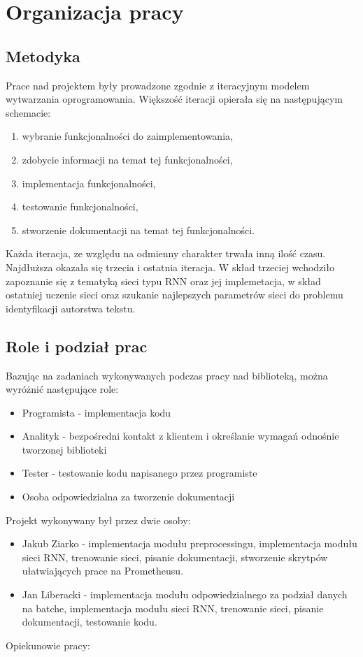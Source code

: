 \newpage
\section{Organizacja pracy}

\subsection{Metodyka}

Prace nad projektem były prowadzone zgodnie z iteracyjnym modelem wytwarzania oprogramowania. 
Większość iteracji opierała się na następującym schemacie: 
\begin{enumerate}
  \item wybranie funkcjonalności do zaimplementowania,
  \item zdobycie informacji na temat tej funkcjonalności,
  \item implementacja funkcjonalności,
  \item testowanie funkcjonalności,
  \item stworzenie dokumentacji na temat tej funkcjonalności.
\end{enumerate}
Każda iteracja, ze względu na odmienny charakter trwała inną ilość czasu. Najdłuższa okazała się
trzecia i ostatnia iteracja. W skład trzeciej wchodziło zapoznanie się z tematyką sieci typu RNN oraz
jej implemetacja, w skład ostatniej uczenie sieci oraz szukanie najlepszych parametrów sieci do problemu 
identyfikacji autorstwa tekstu.

\subsection{Role i podział prac}
Bazując na zadaniach wykonywanych podczas pracy nad biblioteką, można wyróżnić następujące role:
\begin{itemize}
  \item Programista - implementacja kodu
  \item Analityk -  bezpośredni kontakt z klientem i określanie wymagań odnośnie tworzonej biblioteki
  \item Tester - testowanie kodu napisanego przez programiste
  \item Osoba odpowiedzialna za tworzenie dokumentacji
\end{itemize}
Projekt wykonywany był przez dwie osoby:
\begin{itemize}
  \item Jakub Ziarko - implementacja modułu preprocessingu, implementacja modułu sieci RNN, 
  trenowanie sieci, pisanie dokumentacji, stworzenie skrytpów ułatwiających prace na Prometheusu.
  \item Jan Liberacki - implementacja modułu odpowiedzialnego za podział danych na batche, 
  implementacja modułu sieci RNN, trenowanie sieci, pisanie dokumentacji, testowanie kodu.
\end{itemize}
Opiekunowie pracy:


